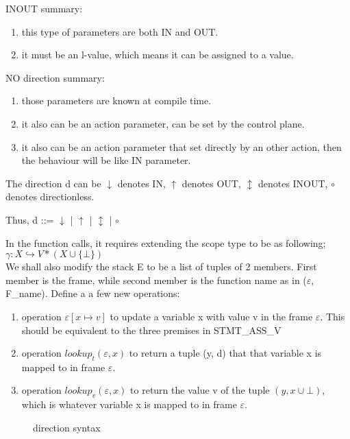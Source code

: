 \documentclass[UTF8]{article}
\begin{document}
INOUT summary:
\begin{enumerate}
\item this type of parameters are both IN and OUT.
\item it must be an l-value, which means it can be assigned to a value.
\end{enumerate}
NO direction summary:
\begin{enumerate}
\item those parameters are known at compile time.
\item it also can be an action parameter, can be set by the control plane.
\item it also can be an action parameter that set directly by an other action, then the behaviour will be like IN parameter.
\end{enumerate}

The direction d can be $\downarrow$ denotes IN, $\uparrow$ denotes OUT, $\updownarrow$ denotes INOUT, $\circ$ denotes directionless. 

Thus,
d ::= $\downarrow$ | $\uparrow$ | $\updownarrow$ | $\circ$

In the function calls, it requires extending the scope type to be as following;
$ \gamma : X \hookrightarrow V * (X \cup \{ \bot \})  $ \\We shall also modify the stack E to be a list of tuples of 2 members. First member is the frame, while second member is the function name as in ($\varepsilon$, F\_name). Define a a few new operations: 
\begin{enumerate}
\item operation $\varepsilon[x \longmapsto v]$ to update a variable x with value v in the frame $\varepsilon$. This should be equivalent to the three premises in STMT\_ASS\_V
\item operation $lookup_t(\varepsilon, x)$ to return a tuple (y, d) that that variable x is mapped to in frame $\varepsilon$. 
\item operation $lookup_v(\varepsilon, x)$ to return the value v of the tuple $(y, x \cup {\bot})$, which is whatever variable x is mapped to in frame $\varepsilon$. 
\end{enumerate}

\begin{figure}[h]
\centering\ottgrammartabular{
\ottd\ottafterlastrule
}
\caption{direction syntax}
\label{fig:dir}
\end{figure}

\end{document}
